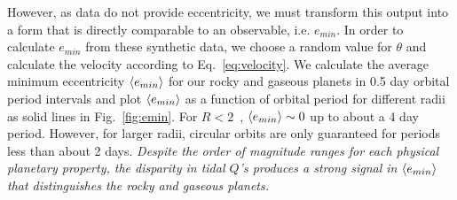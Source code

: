 However, as \kepler data do not provide eccentricity, we must transform this output
into a form that is directly comparable to an observable, i.e. $e_{min}$. In order to
calculate $e_{min}$ from these synthetic data, we choose a random
value for $\theta$ and calculate the velocity according to
Eq.~\ref{eq:velocity}. We calculate the average minimum eccentricity
$\left< e_{min} \right>$ for our rocky and gaseous planets in 0.5 day orbital
period intervals and plot $\left< e_{min} \right>$ as a function of orbital
period for different radii as solid lines in Fig.~\ref{fig:emin}. For
$R < 2$~\rearth, $\left< e_{min} \right>
\sim 0$ up to about a 4 day period. However, for larger radii,
circular orbits are only guaranteed for periods less than about 2
days. \textit{Despite the order of magnitude ranges for each physical
  planetary property, the disparity in tidal $Q$'s produces a strong
  signal in $\left< e_{min} \right>$ that distinguishes the rocky and gaseous
  planets. }


